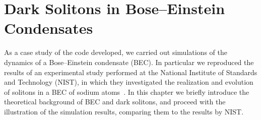 \chapter{Dark Solitons in Bose--Einstein Condensates}
As a case study of the code developed, we carried out simulations of the dynamics of a Bose--Einstein condensate (BEC). In particular we reproduced the results of an experimental study performed at the National Institute of Standards and Technology (NIST), in which they investigated the realization and evolution of solitons in a BEC of sodium atoms~\citep{DSF00}. In this chapter we briefly introduce the theoretical background of BEC and dark solitons, and proceed with the illustration of the simulation results, comparing them to the results by NIST.

